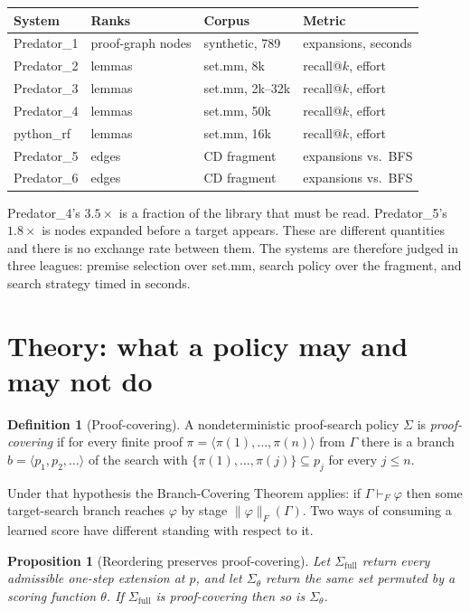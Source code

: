 \documentclass[11pt]{article}
\theoremstyle{plain}
\newtheorem{proposition}[theorem]{Proposition}
\theoremstyle{definition}
\newtheorem{definition}[theorem]{Definition}
\theoremstyle{remark}
\newcommand{\Sig}{\Sigma}
\begin{document}
\begin{center}
\small
\begin{tabular}{llll}
\toprule
\textbf{System} & \textbf{Ranks} & \textbf{Corpus} & \textbf{Metric} \\
\midrule
Predator\_1 & proof-graph nodes & synthetic, 789 & expansions, seconds \\
Predator\_2 & lemmas & set.mm, 8k & recall@$k$, effort \\
Predator\_3 & lemmas & set.mm, 2k--32k & recall@$k$, effort \\
Predator\_4 & lemmas & set.mm, 50k & recall@$k$, effort \\
python\_rf & lemmas & set.mm, 16k & recall@$k$, effort \\
Predator\_5 & edges & CD fragment & expansions vs.\ BFS \\
Predator\_6 & edges & CD fragment & expansions vs.\ BFS \\
\bottomrule
\end{tabular}
\end{center}

Predator\_4's $3.5\times$ is a fraction of the library that must be read.
Predator\_5's $1.8\times$ is nodes expanded before a target appears. These are
different quantities and there is no exchange rate between them. The systems are
therefore judged in three leagues: premise selection over set.mm, search policy
over the fragment, and search strategy timed in seconds.

\section{Theory: what a policy may and may not do}

\begin{definition}[Proof-covering]
A nondeterministic proof-search policy $\Sig$ is \emph{proof-covering} if for
every finite proof $\pi = \langle \pi(1),\dots,\pi(n) \rangle$ from $\Gamma$
there is a branch $b = \langle p_1, p_2, \dots \rangle$ of the search with
$\{\pi(1),\dots,\pi(j)\} \subseteq p_j$ for every $j \le n$.
\end{definition}

Under that hypothesis the Branch-Covering Theorem applies: if $\Gamma \vdash_F
\varphi$ then some target-search branch reaches $\varphi$ by stage
$\|\varphi\|_F(\Gamma)$. Two ways of consuming a learned score have different
standing with respect to it.

\begin{proposition}[Reordering preserves proof-covering]
\label{prop:reorder}
Let $\Sig_{\mathrm{full}}$ return every admissible one-step extension at $p$,
and let $\Sig_\theta$ return the same set permuted by a scoring function
$\theta$. If $\Sig_{\mathrm{full}}$ is proof-covering then so is $\Sig_\theta$.
\end{proposition}
\end{document}
